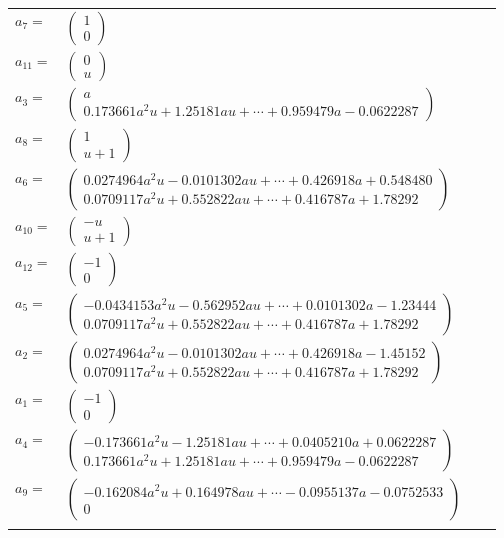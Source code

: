 \documentclass[1p]{elsarticle_modified}
\theoremstyle{definition}
\begin{document}
\begin{tabular}{m{7pt} m{180pt} m{7pt} m{180pt} }
\flushright $a_{7}=$&$\begin{pmatrix}1\\0\end{pmatrix}$ \\
\flushright $a_{11}=$&$\begin{pmatrix}0\\u\end{pmatrix}$ \\
\flushright $a_{3}=$&$\begin{pmatrix}a\\0.173661 a^{2} u+1.25181 a u+\cdots+0.959479 a-0.0622287\end{pmatrix}$ \\
\flushright $a_{8}=$&$\begin{pmatrix}1\\u+1\end{pmatrix}$ \\
\flushright $a_{6}=$&$\begin{pmatrix}0.0274964 a^{2} u-0.0101302 a u+\cdots+0.426918 a+0.548480\\0.0709117 a^{2} u+0.552822 a u+\cdots+0.416787 a+1.78292\end{pmatrix}$ \\
\flushright $a_{10}=$&$\begin{pmatrix}- u\\u+1\end{pmatrix}$ \\
\flushright $a_{12}=$&$\begin{pmatrix}-1\\0\end{pmatrix}$ \\
\flushright $a_{5}=$&$\begin{pmatrix}-0.0434153 a^{2} u-0.562952 a u+\cdots+0.0101302 a-1.23444\\0.0709117 a^{2} u+0.552822 a u+\cdots+0.416787 a+1.78292\end{pmatrix}$ \\
\flushright $a_{2}=$&$\begin{pmatrix}0.0274964 a^{2} u-0.0101302 a u+\cdots+0.426918 a-1.45152\\0.0709117 a^{2} u+0.552822 a u+\cdots+0.416787 a+1.78292\end{pmatrix}$ \\
\flushright $a_{1}=$&$\begin{pmatrix}-1\\0\end{pmatrix}$ \\
\flushright $a_{4}=$&$\begin{pmatrix}-0.173661 a^{2} u-1.25181 a u+\cdots+0.0405210 a+0.0622287\\0.173661 a^{2} u+1.25181 a u+\cdots+0.959479 a-0.0622287\end{pmatrix}$ \\
\flushright $a_{9}=$&$\begin{pmatrix}-0.162084 a^{2} u+0.164978 a u+\cdots-0.0955137 a-0.0752533\\0\end{pmatrix}$\\&\end{tabular}
\end{document}
